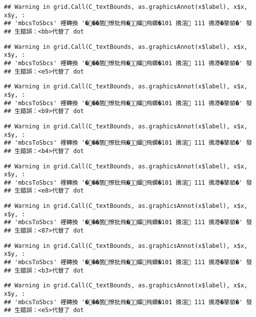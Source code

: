 \documentclass[
]{article}
\begin{document}
\begin{verbatim}
## Warning in grid.Call(C_textBounds, as.graphicsAnnot(x$label), x$x, x$y, :
## 'mbcsToSbcs' 裡轉換 '���箇憭批飛�蝘飛蝟�101 撟渲 111 撟港�摮貊�' 發
## 生錯誤：<bb>代替了 dot
\end{verbatim}

\begin{verbatim}
## Warning in grid.Call(C_textBounds, as.graphicsAnnot(x$label), x$x, x$y, :
## 'mbcsToSbcs' 裡轉換 '���箇憭批飛�蝘飛蝟�101 撟渲 111 撟港�摮貊�' 發
## 生錯誤：<e5>代替了 dot
\end{verbatim}

\begin{verbatim}
## Warning in grid.Call(C_textBounds, as.graphicsAnnot(x$label), x$x, x$y, :
## 'mbcsToSbcs' 裡轉換 '���箇憭批飛�蝘飛蝟�101 撟渲 111 撟港�摮貊�' 發
## 生錯誤：<b9>代替了 dot
\end{verbatim}

\begin{verbatim}
## Warning in grid.Call(C_textBounds, as.graphicsAnnot(x$label), x$x, x$y, :
## 'mbcsToSbcs' 裡轉換 '���箇憭批飛�蝘飛蝟�101 撟渲 111 撟港�摮貊�' 發
## 生錯誤：<b4>代替了 dot
\end{verbatim}

\begin{verbatim}
## Warning in grid.Call(C_textBounds, as.graphicsAnnot(x$label), x$x, x$y, :
## 'mbcsToSbcs' 裡轉換 '���箇憭批飛�蝘飛蝟�101 撟渲 111 撟港�摮貊�' 發
## 生錯誤：<e8>代替了 dot
\end{verbatim}

\begin{verbatim}
## Warning in grid.Call(C_textBounds, as.graphicsAnnot(x$label), x$x, x$y, :
## 'mbcsToSbcs' 裡轉換 '���箇憭批飛�蝘飛蝟�101 撟渲 111 撟港�摮貊�' 發
## 生錯誤：<87>代替了 dot
\end{verbatim}

\begin{verbatim}
## Warning in grid.Call(C_textBounds, as.graphicsAnnot(x$label), x$x, x$y, :
## 'mbcsToSbcs' 裡轉換 '���箇憭批飛�蝘飛蝟�101 撟渲 111 撟港�摮貊�' 發
## 生錯誤：<b3>代替了 dot
\end{verbatim}

\begin{verbatim}
## Warning in grid.Call(C_textBounds, as.graphicsAnnot(x$label), x$x, x$y, :
## 'mbcsToSbcs' 裡轉換 '���箇憭批飛�蝘飛蝟�101 撟渲 111 撟港�摮貊�' 發
## 生錯誤：<e5>代替了 dot
\end{verbatim}
\end{document}
